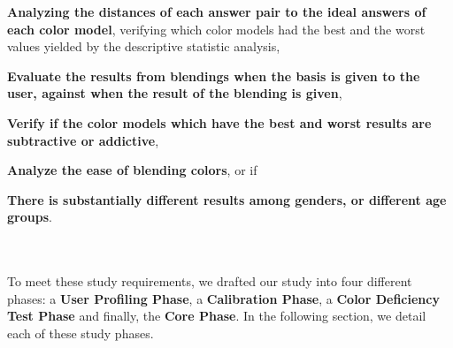 \begin{enumerate*}
		\item \textbf{Analyzing the distances of each answer pair to the ideal answers of each color model}, verifying
		which color models had the best and the worst values yielded by the descriptive statistic analysis,
		\item \textbf{Evaluate the results from blendings when the basis is given to the user, against when the result
		of the blending is given},
		\item \textbf{Verify if the color models which have the best and worst results are subtractive or addictive},
		\item \textbf{Analyze the ease of blending colors}, or if
		\item \textbf{There is substantially different results among genders, or different age groups}.
\end{enumerate*}
\\ \\
%
To meet these study requirements, we drafted our study into four different phases: a \textbf{User Profiling Phase},
a \textbf{Calibration Phase}, a \textbf{Color Deficiency Test Phase} and finally, the \textbf{Core Phase}. In the
following section, we detail each of these study phases. \par
%
